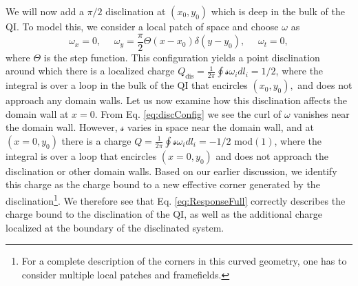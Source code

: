 \documentclass[%
 reprint,
 amsmath,amssymb,
 aps,
]{revtex4-1}
\begin{document}
We will now add a $\pi/2$ disclination at $(x_0,y_0)$ which is deep in the bulk of the QI. To model this, we consider a local patch of space and choose $\omega$ as
\begin{equation}
\omega_x = 0, \phantom{=} \omega_y = \frac{\pi}{2}\Theta(x-x_0)\delta(y-y_0), \phantom{=} \omega_t =0,
\label{eq:discConfig}\end{equation}
where $\Theta$ is the step function. This configuration yields a point disclination around which there is a localized charge $Q_{\text{dis}}= \frac{1}{2\pi}\oint \mathscr{s} \omega_idl_i = 1/2$, where the integral is over a loop in the bulk of the QI that encircles $(x_0,y_0),$ and does not approach any domain walls. Let us now examine how this disclination affects the domain wall at $x=0$. From Eq. \ref{eq:discConfig} we see the curl of $\omega$ vanishes near the domain wall. However, $\mathscr{s}$ varies in space near the domain wall, and at $(x = 0,y_0)$ there is a charge $Q = \frac{1}{2\pi}\oint \mathscr{s} \omega_i dl_i = -1/2$ mod$(1)$, where the integral is over a loop that encircles $(x = 0,y_0)$ and does not approach the disclination or other domain walls. Based on our earlier discussion, we identify this charge as the charge bound to a new effective corner generated by the disclination\footnote{For a complete description of the corners in this curved geometry, one has to consider multiple local patches and framefields.}. We therefore see that Eq. \ref{eq:ResponseFull} correctly describes the charge bound to the disclination of the QI, as well as the additional charge localized at the boundary of the disclinated system.
\end{document}
